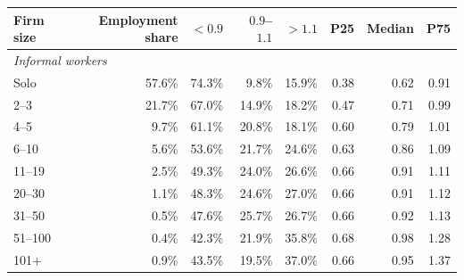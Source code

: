 \begin{tabular}{lrrrrrrr}
\toprule
    Firm size & Employment share & $<0.9$ & $0.9$--$1.1$ & $>1.1$ & P25 & Median & P75 \\
    \midrule
\multicolumn{8}{l}{\textit{Informal workers}} \\
Solo & 57.6\% & 74.3\% & 9.8\% & 15.9\% & 0.38 & 0.62 & 0.91 \\
2--3 & 21.7\% & 67.0\% & 14.9\% & 18.2\% & 0.47 & 0.71 & 0.99 \\
4--5 & 9.7\% & 61.1\% & 20.8\% & 18.1\% & 0.60 & 0.79 & 1.01 \\
6--10 & 5.6\% & 53.6\% & 21.7\% & 24.6\% & 0.63 & 0.86 & 1.09 \\
11--19 & 2.5\% & 49.3\% & 24.0\% & 26.6\% & 0.66 & 0.91 & 1.11 \\
20--30 & 1.1\% & 48.3\% & 24.6\% & 27.0\% & 0.66 & 0.91 & 1.12 \\
31--50 & 0.5\% & 47.6\% & 25.7\% & 26.7\% & 0.66 & 0.92 & 1.13 \\
51--100 & 0.4\% & 42.3\% & 21.9\% & 35.8\% & 0.68 & 0.98 & 1.28 \\
101+ & 0.9\% & 43.5\% & 19.5\% & 37.0\% & 0.66 & 0.95 & 1.37\\
\bottomrule\end{tabular}

